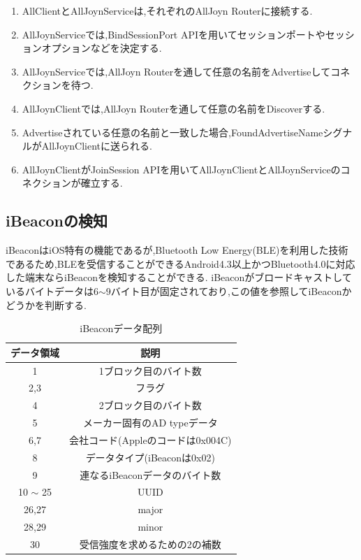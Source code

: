 \begin{enumerate}
\item AllClientとAllJoynServiceは,それぞれのAllJoyn Routerに接続する.
\item AllJoynServiceでは,BindSessionPort APIを用いてセッションポートやセッションオプションなどを決定する.
\item AllJoynServiceでは,AllJoyn Routerを通して任意の名前をAdvertiseしてコネクションを待つ.
\item AllJoynClientでは,AllJoyn Routerを通して任意の名前をDiscoverする.
\item Advertiseされている任意の名前と一致した場合,FoundAdvertiseNameシグナルがAllJoynClientに送られる.
\item AllJoynClientがJoinSession APIを用いてAllJoynClientとAllJoynServiceのコネクションが確立する.
\end{enumerate}


\subsection{iBeaconの検知}
iBeaconはiOS特有の機能であるが,Bluetooth Low Energy(BLE)を利用した技術であるため,BLEを受信することができるAndroid4.3以上かつBluetooth4.0に対応した端末ならiBeaconを検知することができる.
iBeaconがブロードキャストしているバイトデータは6$\sim$9バイト目が固定されており,この値を参照してiBeaconかどうかを判断する.

\begin{table}[htbp]
  \centering
  \begin{tabular}{|c|c|} \hline
    データ領域 & 説明 \\ \hline \hline
    1   & 1ブロック目のバイト数 \\ \hline
    2,3 & フラグ \\ \hline
    4   & 2ブロック目のバイト数 \\ \hline
    5   & メーカー固有のAD typeデータ \\ \hline
    6,7 & 会社コード(Appleのコードは0x004C) \\ \hline
    8   & データタイプ(iBeaconは0x02) \\ \hline
    9   & 連なるiBeaconデータのバイト数 \\ \hline
    10 $\sim$ 25 & UUID \\ \hline
    26,27 & major \\ \hline
    28,29 & minor \\ \hline
    30  & 受信強度を求めるための2の補数 \\ \hline
  \end{tabular}
  \caption{iBeaconデータ配列}
\end{table}

